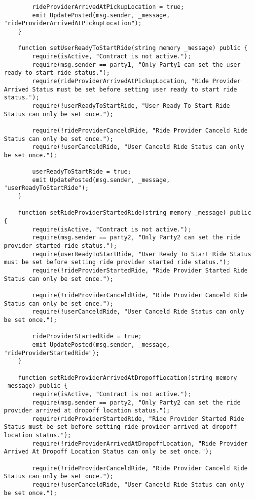 \begin{lstlisting}
        rideProviderArrivedAtPickupLocation = true;
        emit UpdatePosted(msg.sender, _message, "rideProviderArrivedAtPickupLocation");
    }

    function setUserReadyToStartRide(string memory _message) public {
        require(isActive, "Contract is not active.");
        require(msg.sender == party1, "Only Party1 can set the user ready to start ride status.");
        require(rideProviderArrivedAtPickupLocation, "Ride Provider Arrived Status must be set before setting user ready to start ride status.");
        require(!userReadyToStartRide, "User Ready To Start Ride Status can only be set once.");

        require(!rideProviderCanceldRide, "Ride Provider Canceld Ride Status can only be set once.");
        require(!userCanceldRide, "User Canceld Ride Status can only be set once.");

        userReadyToStartRide = true;
        emit UpdatePosted(msg.sender, _message, "userReadyToStartRide");
    }

    function setRideProviderStartedRide(string memory _message) public {
        require(isActive, "Contract is not active.");
        require(msg.sender == party2, "Only Party2 can set the ride provider started ride status.");
        require(userReadyToStartRide, "User Ready To Start Ride Status must be set before setting ride provider started ride status.");
        require(!rideProviderStartedRide, "Ride Provider Started Ride Status can only be set once.");

        require(!rideProviderCanceldRide, "Ride Provider Canceld Ride Status can only be set once.");
        require(!userCanceldRide, "User Canceld Ride Status can only be set once.");

        rideProviderStartedRide = true;
        emit UpdatePosted(msg.sender, _message, "rideProviderStartedRide");
    }

    function setRideProviderArrivedAtDropoffLocation(string memory _message) public {
        require(isActive, "Contract is not active.");
        require(msg.sender == party2, "Only Party2 can set the ride provider arrived at dropoff location status.");
        require(rideProviderStartedRide, "Ride Provider Started Ride Status must be set before setting ride provider arrived at dropoff location status.");
        require(!rideProviderArrivedAtDropoffLocation, "Ride Provider Arrived At Dropoff Location Status can only be set once.");

        require(!rideProviderCanceldRide, "Ride Provider Canceld Ride Status can only be set once.");
        require(!userCanceldRide, "User Canceld Ride Status can only be set once.");


\end{lstlisting}
